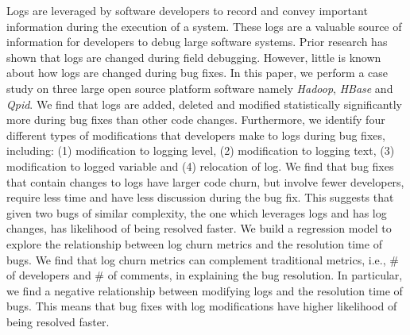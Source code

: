 Logs are leveraged by software developers to record and convey important information during the execution of a system. These logs are a valuable source of information for developers to debug large software systems. Prior research has shown that logs are changed during field debugging. However, little is known about how logs are changed during bug fixes. In this paper, we perform a  case study on three large open source platform software namely \emph{Hadoop}, \emph{HBase} and \emph{Qpid}. We find that logs are added, deleted and modified statistically significantly more during bug fixes than other code changes. Furthermore, we identify four different types of modifications that developers make to logs during bug fixes, including: (1) modification to logging level, (2) modification to logging text, (3) modification to logged variable and (4) relocation of log. We find that bug fixes that contain changes to logs have larger code churn, but involve fewer developers, require less time and have less discussion during the bug fix. This suggests that given two bugs of similar complexity, the one which leverages logs and has log changes, has likelihood of being resolved faster. We build a regression model to explore the relationship between log churn metrics and the resolution time of bugs. We find that log churn metrics can complement traditional metrics, i.e., \# of developers and \# of comments, in explaining the bug resolution. In particular, we find a negative relationship between modifying logs and the resolution time of bugs. This means that bug fixes with log modifications have higher likelihood of being resolved faster.

